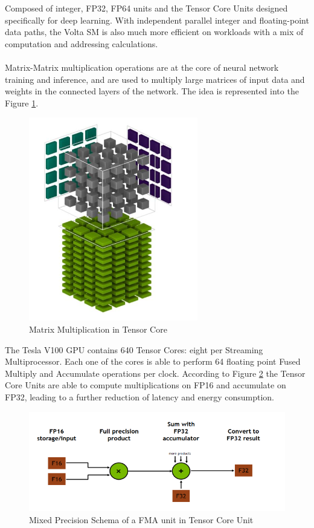 Composed of integer, FP32, FP64 units and the Tensor Core Units designed specifically for deep learning. With independent parallel integer and floating-point data paths, the Volta SM is also much more efficient on workloads with a mix of computation and addressing calculations. \\\\

Matrix-Matrix multiplication operations are at the core of neural network training and inference, and are used to multiply large matrices of input data and weights in the connected layers of the network. The idea is represented into the Figure \ref{fig:tensorcorevolta}.

\begin{figure}[!htbp]
\centering
\captionsetup{justification=centering}
\includegraphics[scale=0.7]{./figure/tensor_core.PNG}
\caption{Matrix Multiplication in Tensor Core}
\label{fig:tensorcorevolta}
\end{figure}

The Tesla V100 GPU contains 640 Tensor Cores: eight per Streaming Multiprocessor. Each one of the cores is able to perform 64 floating point Fused Multiply and Accumulate operations per clock.
According to Figure \ref{fig:mixprec} the Tensor Core Units are able to compute multiplications on FP16 and accumulate on FP32, leading to a further reduction of latency and energy consumption.
\begin{figure}[!htbp]
\centering
\captionsetup{justification=centering}
\includegraphics[scale=0.8]{./figure/mix_prec.PNG}
\caption{Mixed Precision Schema of a FMA unit in Tensor Core Unit}
\label{fig:mixprec}
\end{figure}

